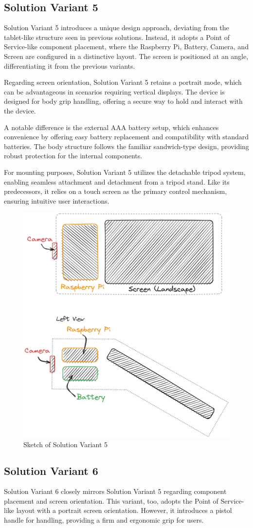 \subsection{Solution Variant 5}
Solution Variant 5 introduces a unique design approach, deviating from the tablet-like structure seen in previous solutions. Instead, it adopts a Point of Service-like component placement, where the Raspberry Pi, Battery, Camera, and Screen are configured in a distinctive layout. The screen is positioned at an angle, differentiating it from the previous variants.

Regarding screen orientation, Solution Variant 5 retains a portrait mode, which can be advantageous in scenarios requiring vertical displays. The device is designed for body grip handling, offering a secure way to hold and interact with the device.

A notable difference is the external AAA battery setup, which enhances convenience by offering easy battery replacement and compatibility with standard batteries. The body structure follows the familiar sandwich-type design, providing robust protection for the internal components.

For mounting purposes, Solution Variant 5 utilizes the detachable tripod system, enabling seamless attachment and detachment from a tripod stand. Like its predecessors, it relies on a touch screen as the primary control mechanism, ensuring intuitive user interactions.

\begin{figure}[H]
    \centering
    \includegraphics[width=0.5\linewidth]{texs/Part1/chapter3/image/v5.png}
    \caption{Sketch of Solution Variant 5}
    \label{fig:sketch-solution-variant-5}
\end{figure}

\subsection{Solution Variant 6}
Solution Variant 6 closely mirrors Solution Variant 5 regarding component placement and screen orientation. This variant, too, adopts the Point of Service-like layout with a portrait screen orientation. However, it introduces a pistol handle for handling, providing a firm and ergonomic grip for users.

